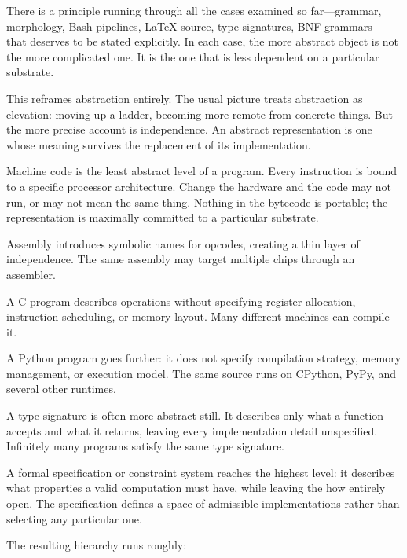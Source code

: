 \documentclass[12pt]{article}
\begin{document}
There is a principle running through all the cases examined so far---grammar, morphology, Bash pipelines, \LaTeX{} source, type signatures, BNF grammars---that deserves to be stated explicitly. In each case, the more abstract object is not the more complicated one. It is the one that is less dependent on a particular substrate.

This reframes abstraction entirely. The usual picture treats abstraction as elevation: moving up a ladder, becoming more remote from concrete things. But the more precise account is independence. An abstract representation is one whose meaning survives the replacement of its implementation.

Machine code is the least abstract level of a program. Every instruction is bound to a specific processor architecture. Change the hardware and the code may not run, or may not mean the same thing. Nothing in the bytecode is portable; the representation is maximally committed to a particular substrate.

Assembly introduces symbolic names for opcodes, creating a thin layer of independence. The same assembly may target multiple chips through an assembler.

A C program describes operations without specifying register allocation, instruction scheduling, or memory layout. Many different machines can compile it.

A Python program goes further: it does not specify compilation strategy, memory management, or execution model. The same source runs on CPython, PyPy, and several other runtimes.

A type signature is often more abstract still. It describes only what a function accepts and what it returns, leaving every implementation detail unspecified. Infinitely many programs satisfy the same type signature.

A formal specification or constraint system reaches the highest level: it describes what properties a valid computation must have, while leaving the how entirely open. The specification defines a space of admissible implementations rather than selecting any particular one.

\medskip

\noindent The resulting hierarchy runs roughly:
\end{document}

